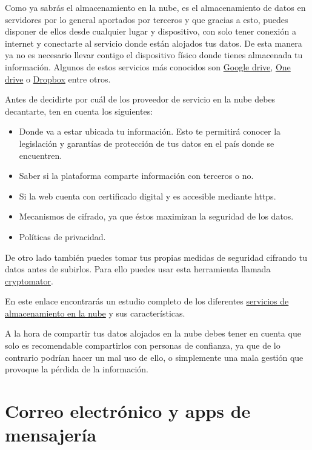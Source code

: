 \documentclass[
  spanish,
  a4paper,
  openany]{book}
\begin{document}
Como ya sabrás el almacenamiento en la nube, es el almacenamiento de datos en servidores por lo general aportados por terceros y que gracias a esto, puedes disponer de ellos desde cualquier lugar y dispositivo, con solo tener conexión a internet y conectarte al servicio donde están alojados tus datos. De esta manera ya no es necesario llevar contigo el dispositivo físico donde tienes almacenada tu información. Algunos de estos servicios más conocidos son \href{https://www.google.com/intl/en_in/drive/}{Google drive}, \href{https://www.microsoft.com/en-us/microsoft-365/onedrive/online-cloud-storage}{One drive} o \href{https://www.dropbox.com/}{Dropbox} entre otros.

Antes de decidirte por cuál de los proveedor de servicio en la nube debes decantarte, ten en cuenta los siguientes:

\begin{itemize}
\item
  Donde va a estar ubicada tu información. Esto te permitirá conocer la legislación y
  garantías de protección de tus datos en el país donde se encuentren.
\item
  Saber si la plataforma comparte información con terceros o no.
\item
  Si la web cuenta con certificado digital y es accesible mediante https.
\item
  Mecanismos de cifrado, ya que éstos maximizan la seguridad de los datos.
\item
  Políticas de privacidad.
\end{itemize}

De otro lado también puedes tomar tus propias medidas de seguridad cifrando tu datos antes de subirlos. Para ello puedes usar esta herramienta llamada \href{https://cryptomator.org/}{cryptomator}.

En este enlace encontrarás un estudio completo de los diferentes \href{https://www.osi.es/sites/default/files/docs/osi_servicios_nube.pdf}{servicios de almacenamiento en la nube} y sus características.

A la hora de compartir tus datos alojados en la nube debes tener en cuenta que solo es recomendable compartirlos con personas de confianza, ya que de lo contrario podrían hacer un mal uso de ello, o simplemente una mala gestión que provoque la pérdida de la información.

\hypertarget{correo-electruxf3nico-y-apps-de-mensajeruxeda}{%
\section{Correo electrónico y apps de mensajería}\label{correo-electruxf3nico-y-apps-de-mensajeruxeda}}
\end{document}
